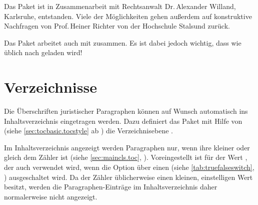 Das Paket ist in Zusammenarbeit mit Rechtsanwalt Dr.\,Alexander Willand,
Karlsruhe, entstanden. Viele der Möglichkeiten gehen außerdem auf konstruktive
Nachfragen von Prof.\,Heiner Richter von der Hochschule Stalsund zurück.

\iffalse %
Es ist zu beachten, dass das Paket mit
\Package{hyperref}\IndexPackage{hyperref}\important{\Package{hyperref}}
zusammenarbeitet. %
\else%
Das Paket arbeitet auch mit
zusammen. %
\fi%
Es ist dabei jedoch wichtig, dass  wie üblich nach
 geladen wird!



\section{Verzeichnisse}

Die Überschriften juristischer Paragraphen können auf Wunsch automatisch
ins Inhaltsverzeichnis eingetragen
werden. Dazu definiert das Paket mit Hilfe
von  (siehe
\autoref{sec:tocbasic.tocstyle} ab
)
die Verzeichnisebene .

\begin{Declaration}
\end{Declaration}
Im Inhaltsverzeichnis angezeigt werden
Paragraphen nur, wenn ihre 
kleiner oder gleich dem Zähler %
 ist
(siehe \autoref{sec:maincls.toc},
). Voreingestellt
ist für  der Wert , der auch verwendet
wird, wenn die Option über einen
 (siehe
\autoref{tab:truefalseswitch}, )
ausgeschaltet wird. Da der Zähler 
üblicherweise einen kleinen, einstelligen Wert besitzt, werden die
Paragraphen-Einträge im Inhaltsverzeichnis daher normalerweise nicht
angezeigt.

